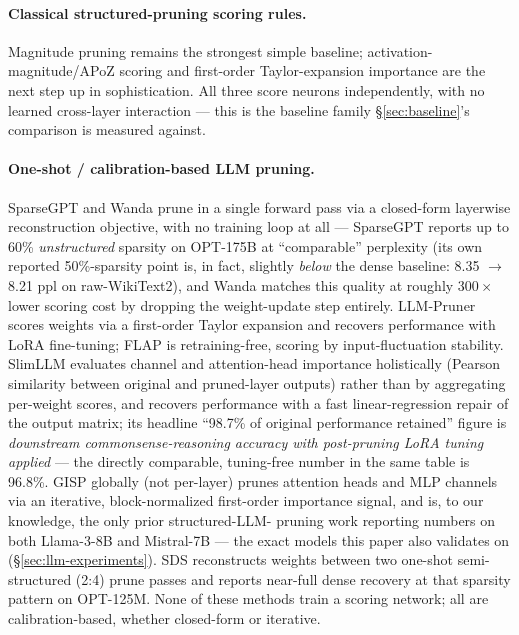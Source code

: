 \documentclass[11pt]{article}
\begin{document}
\paragraph{Classical structured-pruning scoring rules.} Magnitude pruning \citep{han2015learning}
remains the strongest simple baseline; activation-magnitude/APoZ
scoring \citep{hu2016network} and first-order Taylor-expansion importance
\citep{molchanov2017pruning,ma2023llmpruner} are the next step up in
sophistication. All three score neurons independently, with no learned
cross-layer interaction --- this is the baseline family \S\ref{sec:baseline}'s comparison is
measured against.

\paragraph{One-shot / calibration-based LLM pruning.} SparseGPT \citep{frantar2023sparsegpt}
and Wanda \citep{sun2023wanda} prune in a single forward pass via a
closed-form layerwise reconstruction objective, with no training loop at all
--- SparseGPT reports up to 60\% \emph{unstructured} sparsity on OPT-175B at
``comparable'' perplexity (its own reported 50\%-sparsity point is, in fact,
slightly \emph{below} the dense baseline: 8.35 $\to$ 8.21 ppl on raw-WikiText2), and
Wanda matches this quality at roughly $300\times$ lower scoring cost by
dropping the weight-update step entirely. LLM-Pruner \citep{ma2023llmpruner} scores
weights via a first-order Taylor expansion and recovers performance with
LoRA fine-tuning; FLAP \citep{an2023flap} is retraining-free, scoring by
input-fluctuation stability. SlimLLM \citep{guo2025slimllm} evaluates channel and
attention-head importance holistically (Pearson similarity between original
and pruned-layer outputs) rather than by aggregating per-weight scores, and
recovers performance with a fast linear-regression repair of the output
matrix; its headline ``98.7\% of original performance retained'' figure is
\emph{downstream commonsense-reasoning accuracy with post-pruning LoRA tuning
applied} --- the directly comparable, tuning-free number in the same table is
96.8\%. GISP \citep{wang2025gisp} globally (not per-layer) prunes attention
heads and MLP channels via an iterative, block-normalized first-order
importance signal, and is, to our knowledge, the only prior structured-LLM-
pruning work reporting numbers on both Llama-3-8B and Mistral-7B --- the exact
models this paper also validates on (\S\ref{sec:llm-experiments}). SDS \citep{li2024sds} reconstructs
weights between two one-shot semi-structured (2:4) prune passes and reports
near-full dense recovery at that sparsity pattern on OPT-125M. None of these
methods train a scoring network; all are calibration-based, whether
closed-form or iterative.
\end{document}
